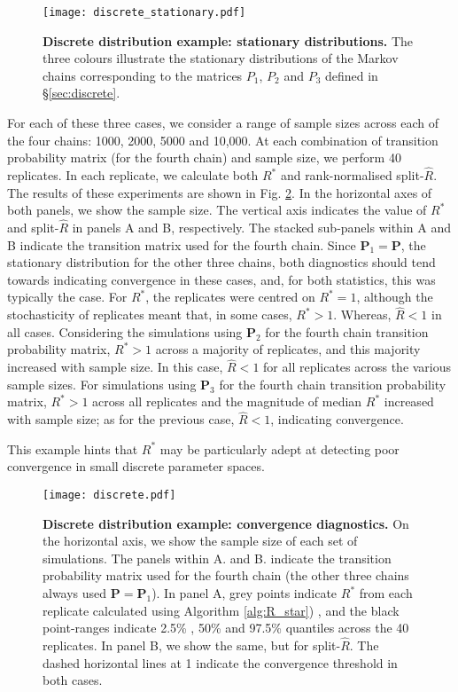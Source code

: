 \documentclass{article}
\begin{document}
\begin{figure}[!htb]
	\centerline{\texttt{[image: discrete\_stationary.pdf]}}
	\caption{\textbf{Discrete distribution example: stationary distributions.} The three colours illustrate the stationary distributions of the Markov chains corresponding to the matrices $P_1$, $P_2$ and $P_3$ defined in \S\ref{sec:discrete}.}
	\label{fig:discrete_stationary}
\end{figure}

For each of these three cases, we consider a range of sample sizes across each of the four chains: 1000, 2000, 5000 and 10,000. At each combination of transition probability matrix (for the fourth chain) and sample size, we perform 40 replicates. In each replicate, we calculate both $R^*$ and rank-normalised split-$\widehat{R}$. The results of these experiments are shown in Fig. \ref{fig:discrete}. In the horizontal axes of both panels, we show the sample size. The vertical axis indicates the value of $R^*$ and split-$\widehat{R}$ in panels A and B, respectively. The stacked sub-panels within A and B indicate the transition matrix used for the fourth chain. Since $\boldsymbol{P}_1=\boldsymbol{P}$, the stationary distribution for the other three chains, both diagnostics should tend towards indicating convergence in these cases, and, for both statistics, this was typically the case. For $R^*$, the replicates were centred on $R^*=1$, although the stochasticity of replicates meant that, in some cases, $R^*>1$. Whereas, $\widehat{R}<1$ in all cases. Considering the simulations using $\boldsymbol{P}_2$ for the fourth chain transition probability matrix, $R^*>1$ across a majority of replicates, and this majority increased with sample size. In this case, $\widehat{R}<1$ for all replicates across the various sample sizes. For simulations using $\boldsymbol{P}_3$ for the fourth chain transition probability matrix, $R^*>1$ across all replicates and the magnitude of median $R^*$ increased with sample size; as for the previous case, $\widehat{R}<1$, indicating convergence.

This example hints that $R^*$ may be particularly adept at detecting poor convergence in small discrete parameter spaces.


\begin{figure}[!htb]
	\centerline{\texttt{[image: discrete.pdf]}}
	\caption{\textbf{Discrete distribution example: convergence diagnostics.} On the horizontal axis, we show the sample size of each set of simulations. The panels within A. and B. indicate the transition probability matrix used for the fourth chain (the other three chains always used $\boldsymbol{P}=\boldsymbol{P}_1$). In panel A, grey points indicate $R^*$ from each replicate calculated using Algorithm \ref{alg:R_star}) , and the black point-ranges indicate 2.5\% , 50\% and 97.5\% quantiles across the 40 replicates. In panel B, we show the same, but for split-$\widehat{R}$. The dashed horizontal lines at 1 indicate the convergence threshold in both cases.}
	\label{fig:discrete}
\end{figure}
\end{document}
